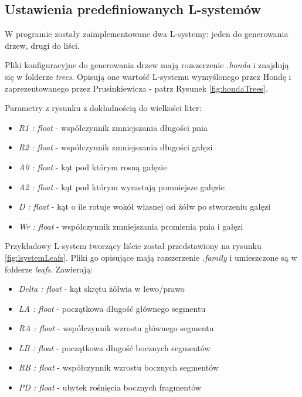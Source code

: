\documentclass[inz,longabstract]{iithesis}
\begin{document}
        \subsection{Ustawienia predefiniowanych L-systemów}
        W programie zostały zaimplementowane dwa L-systemy: jeden do generowania drzew, drugi do liści.
        
        Pliki konfiguracyjne do generowania drzew mają rozszerzenie \textit{.honda} i znajdują się w folderze \textit{trees}. Opisują one wartość L-systemu wymyślonego przez Hondę\cite{honda} i zaprezentowanego przez Prusinkiewicza\cite{plants} - patrz Rysunek \ref{fig:hondaTrees}.
        
        Parametry z rysunku z dokładnością do wielkości liter:
        \begin{itemize}
            \item \textit{R1 : float} - współczynnik zmniejszania długości pnia
            \item \textit{R2 : float} - współczynnik zmniejszania długości gałęzi
            \item \textit{A0 : float} - kąt pod którym rosną gałęzie
            \item \textit{A2 : float} - kąt pod którym wyrastają pomniejsze gałęzie
            \item \textit{D : float} - kąt o ile rotuje wokół własnej osi żółw po stworzeniu gałęzi
            \item \textit{Wr : float} - współczynnik zmniejszania promienia pnia i gałęzi
        \end{itemize}    
        
        Przykładowy L-system tworzący liście został przedstawiony na rysunku \ref{fig:lsystemLeafs}. Pliki go opisujące mają rozszerzenie \textit{.family} i umieszczone są w folderze \textit{leafs}. Zawierają:
        \begin{itemize}
            \item \textit{Delta : float} - kąt skrętu żółwia w lewo/prawo
            \item \textit{LA : float} - początkowa długość głównego segmentu
            \item \textit{RA : float} - współczynnik wzrostu głównego segmentu
            \item \textit{LB : float} - początkowa długość bocznych segmentów
            \item \textit{RB : float} - współczynnik wzrostu bocznych segmentów
            \item \textit{PD : float} - ubytek rośnięcia bocznych fragmentów
        \end{itemize}    
        
\end{document}
